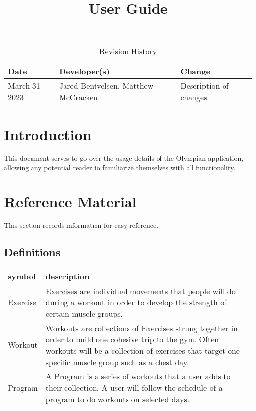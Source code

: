 \documentclass{article}
\title{User Guide\\\progname}
\author{\authname}
\date{}
\begin{document}
\begin{table}[hp]
\caption{Revision History} \label{TblRevisionHistory}
\begin{tabularx}{\textwidth}{llX}
\toprule
\textbf{Date} & \textbf{Developer(s)} & \textbf{Change}\\
\midrule
March 31 2023 & Jared Bentvelsen, Matthew McCracken & Description of changes\\
\bottomrule
\end{tabularx}
\end{table}

\newpage

\maketitle

\tableofcontents

\section{Introduction}

This document serves to go over the usage details of the Olympian application, allowing any potential reader to familiarize themselves with all functionality.

\section{Reference Material}

This section records information for easy reference.

\subsection{Definitions}

\renewcommand{\arraystretch}{1.2}
\begin{tabular}{|l|p{1\linewidth}|}
  \toprule		
  \textbf{symbol} & \textbf{description}\\
  \midrule   
  Exercise & Exercises are individual movements that people will do during a workout in order to develop the strength of certain muscle groups.\\
  Workout & Workouts are collections of Exercises strung together in order to build one cohesive trip to the gym. Often workouts will be a collection of exercises that target one specific muscle group such as a chest day.\\
  Program & A Program is a series of workouts that a user adds to their collection. A user will follow the schedule of a program to do workouts on selected days.\\
  \bottomrule
\end{tabular}\\
\end{document}

